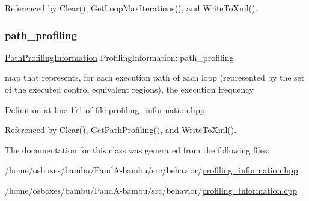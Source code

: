 Referenced by Clear(), Get\+Loop\+Max\+Iterations(), and Write\+To\+Xml().

\mbox{\label{classProfilingInformation_abd736acb393bcda5cf8afa13b1a08bb3}} 
\subsubsection{\texorpdfstring{path\+\_\+profiling}{path\_profiling}}
{\footnotesize\ttfamily \hyperlink{classPathProfilingInformation}{Path\+Profiling\+Information} Profiling\+Information\+::path\+\_\+profiling\hspace{0.3cm}{\ttfamily [private]}}



map that represents, for each execution path of each loop (represented by the set of the executed control equivalent regions), the execution frequency 



Definition at line 171 of file profiling\+\_\+information.\+hpp.



Referenced by Clear(), Get\+Path\+Profiling(), and Write\+To\+Xml().



The documentation for this class was generated from the following files\+:\begin{DoxyCompactItemize}
\item 
/home/osboxes/bambu/\+Pand\+A-\/bambu/src/behavior/\hyperlink{profiling__information_8hpp}{profiling\+\_\+information.\+hpp}\item 
/home/osboxes/bambu/\+Pand\+A-\/bambu/src/behavior/\hyperlink{profiling__information_8cpp}{profiling\+\_\+information.\+cpp}\end{DoxyCompactItemize}
